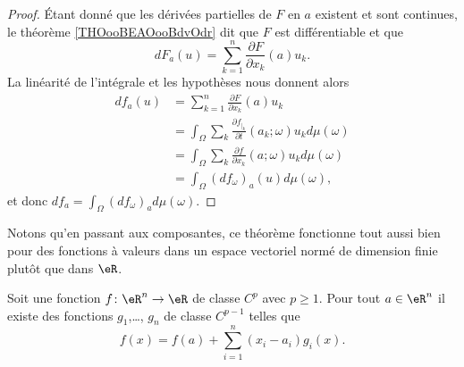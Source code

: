 \begin{proof}
	Étant donné que les dérivées partielles de \( F\) en \( a\) existent et sont continues, le théorème \ref{THOooBEAOooBdvOdr} dit que \( F\) est différentiable et que
	\begin{equation}
		dF_a(u)=\sum_{k=1}^n\frac{ \partial F }{ \partial x_k }(a)u_k.
	\end{equation}
	La linéarité de l'intégrale et les hypothèses nous donnent alors
	\begin{subequations}
		\begin{align}
			df_a(u) & =\sum_{k=1}^n\frac{ \partial F }{ \partial x_k }(a)u_k                                 \\
			        & =\int_{\Omega}\sum_k\frac{ \partial f_{|_k} }{ \partial t }(a_k;\omega)u_kd\mu(\omega) \\
			        & =\int_{\Omega}\sum_k\frac{ \partial f }{ \partial x_k }(a;\omega)u_kd\mu(\omega)       \\
			        & =\int_{\Omega}(df_{\omega})_a(u)d\mu(\omega),
		\end{align}
	\end{subequations}
	et donc \( df_a=\int_{\Omega}(df_{\omega})_ad\mu(\omega)\).
\end{proof}
Notons qu'en passant aux composantes, ce théorème fonctionne tout aussi bien pour des fonctions à valeurs dans un espace vectoriel normé de dimension finie plutôt que dans \( \eR\).

\begin{lemma}   \label{LemWNBooGPlIwT}
	Soit une fonction \( f\colon \eR^n\to \eR\) de classe \( C^p\) avec \( p\geq 1\). Pour tout \( a\in \eR^n\) il existe des fonctions \( g_1\),\ldots, \( g_n\) de classe \( C^{p-1}\) telles que
	\begin{equation}
		f(x)=f(a)+\sum_{i=1}^n(x_i-a_i)g_i(x).
	\end{equation}
\end{lemma}

